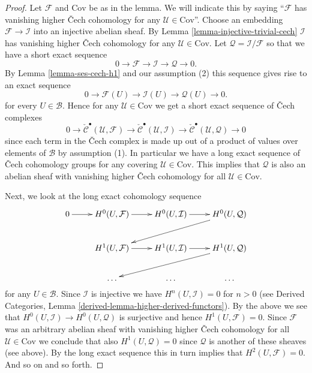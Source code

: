 \documentclass[10pt,a4paper]{amsart}
\theoremstyle{plain}
\theoremstyle{definition}
\theoremstyle{remark}
\numberwithin{equation}{subsection}
\begin{document}
\begin{proof}
Let $\mathcal{F}$ and $\text{Cov}$ be as in the lemma.
We will indicate this by saying ``$\mathcal{F}$ has vanishing higher
{\v C}ech cohomology for any $\mathcal{U} \in \text{Cov}$''.
Choose an embedding $\mathcal{F} \to \mathcal{I}$ into an
injective abelian sheaf.
By Lemma \ref{lemma-injective-trivial-cech} $\mathcal{I}$
has vanishing higher {\v C}ech cohomology for any $\mathcal{U} \in \text{Cov}$.
Let $\mathcal{Q} = \mathcal{I}/\mathcal{F}$
so that we have a short exact sequence
$$
0 \to \mathcal{F} \to \mathcal{I} \to \mathcal{Q} \to 0.
$$
By Lemma \ref{lemma-ses-cech-h1} and our assumption (2)
this sequence gives rise to an exact sequence
$$
0 \to \mathcal{F}(U) \to \mathcal{I}(U) \to \mathcal{Q}(U) \to 0.
$$
for every $U \in \mathcal{B}$. Hence for any $\mathcal{U} \in \text{Cov}$
we get a short exact sequence of {\v C}ech complexes
$$
0 \to
\check{\mathcal{C}}^\bullet(\mathcal{U}, \mathcal{F}) \to
\check{\mathcal{C}}^\bullet(\mathcal{U}, \mathcal{I}) \to
\check{\mathcal{C}}^\bullet(\mathcal{U}, \mathcal{Q}) \to 0
$$
since each term in the {\v C}ech complex is made up out of a product of
values over elements of $\mathcal{B}$ by assumption (1).
In particular we have a long exact sequence of {\v C}ech cohomology
groups for any covering $\mathcal{U} \in \text{Cov}$.
This implies that $\mathcal{Q}$ is also an abelian sheaf
with vanishing higher {\v C}ech cohomology for all
$\mathcal{U} \in \text{Cov}$.

\medskip\noindent
Next, we look at the long exact cohomology sequence
$$
\xymatrix{
0 \ar[r] &
H^0(U, \mathcal{F}) \ar[r] &
H^0(U, \mathcal{I}) \ar[r] &
H^0(U, \mathcal{Q}) \ar[lld] \\
&
H^1(U, \mathcal{F}) \ar[r] &
H^1(U, \mathcal{I}) \ar[r] &
H^1(U, \mathcal{Q}) \ar[lld] \\
&
\ldots & \ldots & \ldots \\
}
$$
for any $U \in \mathcal{B}$. Since $\mathcal{I}$ is injective we
have $H^n(U, \mathcal{I}) = 0$ for $n > 0$ (see
Derived Categories, Lemma \ref{derived-lemma-higher-derived-functors}).
By the above we see that $H^0(U, \mathcal{I}) \to H^0(U, \mathcal{Q})$
is surjective and hence $H^1(U, \mathcal{F}) = 0$.
Since $\mathcal{F}$ was an arbitrary abelian sheaf with
vanishing higher {\v C}ech cohomology for all $\mathcal{U} \in \text{Cov}$
we conclude that also $H^1(U, \mathcal{Q}) = 0$ since $\mathcal{Q}$ is
another of these sheaves (see above). By the long exact sequence this in
turn implies that $H^2(U, \mathcal{F}) = 0$. And so on and so forth.
\end{proof}
\end{document}
